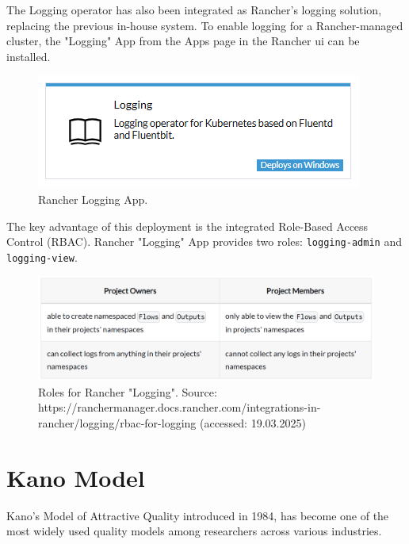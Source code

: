 \documentclass[../main.tex]{subfiles}
\begin{document}
The Logging operator has also been integrated as Rancher's logging solution, replacing the previous in-house system. To enable logging for a Rancher-managed cluster, the "Logging" App from the Apps page in the Rancher \gls{ui} can be installed.

\begin{figure}[H]
        \centering
        \includegraphics[]{img/2-background/centralized_logging/logging_app.png}
        \caption{Rancher Logging App.}
        \label{fig:logging_app}
\end{figure}

The key advantage of this deployment is the integrated Role-Based Access Control (RBAC). Rancher "Logging" App provides two roles: \texttt{logging-admin} and \texttt{logging-view}.

\begin{figure}[H]
        \centering
        \includegraphics[scale=0.7]{img/2-background/rancher_logging_app/roles.png}
        \caption{Roles for Rancher "Logging". Source: https://ranchermanager.docs.rancher.com/integrations-in-rancher/logging/rbac-for-logging (accessed: 19.03.2025)}
        \label{fig:roles}
\end{figure}

\clearpage
\section{Kano Model}

Kano’s Model of Attractive Quality \cite{kano1984attractive} introduced in 1984, has become one of the most widely used quality models among researchers across various industries. 
\end{document}
